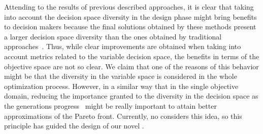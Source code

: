 Attending to the results of previous described approaches, it is clear that taking into account the decision space
diversity in the design phase might bring benefits to decision makers because the final solutions obtained by these 
methods present a larger decision space diversity than the ones obtained by traditional 
approaches~\cite{deb2005omni, rudolph2007capabilities}.
%
Thus, while clear improvements are obtained when taking into account metrics related to the variable decision space, the benefits in terms of the 
objective space are not so clear.
%
We claim that one of the reasons of this behavior might be that the diversity in the variable space is considered 
in the whole optimization process.
%
However, in a similar way that in the single objective domain, reducing the importance granted to the diversity 
in the decision space as the generations progress~\cite{Joel:MULTI_DYNAMIC} might be really important to attain
better approximations of the Pareto front.
%
Currently, no \MOEA{} considers this idea, so this principle has guided the design of our novel \MOEA{}.
